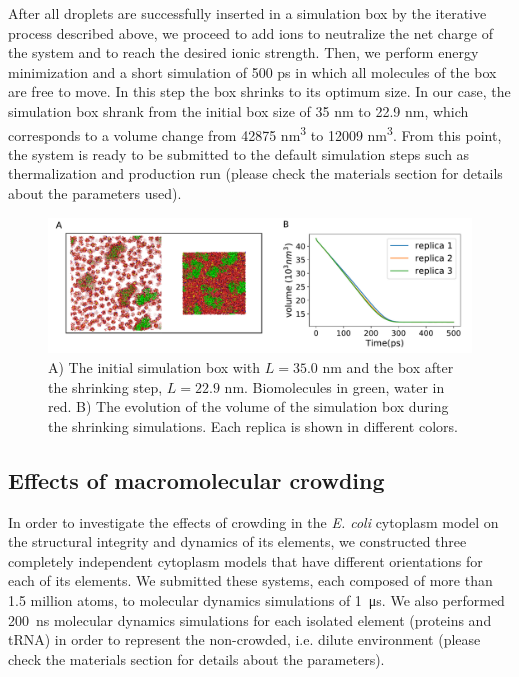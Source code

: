\documentclass[journal=jpcisd8,manuscript=article]{achemso}
\begin{document}
After all droplets are successfully inserted in a simulation box by
the iterative process described above, we proceed to add ions to
neutralize the net charge of the system and to reach the desired ionic
strength. Then, we perform energy minimization and a short simulation
 of 500 ps in which all molecules of the box are free to move. In
this step the box shrinks to its optimum size. In our case, the
simulation box shrank from the initial box size of 35 nm to 22.9 nm,
which corresponds to a volume change from 42875 nm\textsuperscript{3}
to 12009 nm\textsuperscript{3}. From this point, the system is ready
to be submitted to the default simulation steps such as thermalization
and production run (please check the materials section for details
about the parameters used).

\begin{figure}[H]
\includegraphics[scale=0.5]{shrinking.pdf}
\caption{A) The initial simulation box with $L=35.0$ nm and the box
  after the shrinking step, $L=22.9$ nm. Biomolecules in green, water in red. B) The evolution of the
  volume of the simulation box during the shrinking simulations. Each
  replica is shown in different colors. }
\label{shrink}
\end{figure}

\subsection{Effects of macromolecular crowding}

In order to investigate the effects of crowding in the
\textit{E. coli} cytoplasm model on the structural integrity and
dynamics of its elements, we constructed three completely independent
cytoplasm models that have different orientations for each of its
elements. We submitted these systems, each composed of more than 1.5
million atoms, to molecular dynamics simulations of
\SI{1}{\micro\second}. We also performed \SI{200}{\nano\second}
molecular dynamics simulations for each isolated element (proteins and
tRNA) in order to represent the non-crowded, i.e. dilute environment
(please check the materials section for details about the parameters).
\end{document}

